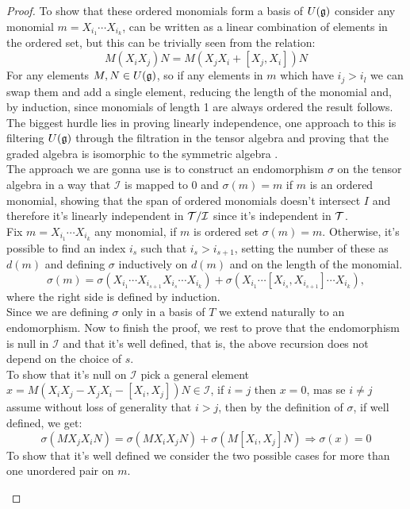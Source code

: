 \begin{proof}
	To show that these ordered monomials form a basis of $U(\mathfrak{g})$ consider any monomial
	$m=X_{i_1}\cdots X_{i_k}$, can be written as a linear combination of elements in the ordered set, but this can be trivially seen from the relation:
	$$ M(X_iX_j)N = M(X_jX_i+[X_j,X_i])N$$
	For any elements $M,N \in U(\mathfrak{g})$, so if any elements in $m$ which have $i_j>i_l$ we can swap them and add a single element, reducing the length of the monomial and, by induction, since monomials of length 1 are always ordered the result follows.\\
	The biggest hurdle lies in proving linearly independence, one approach to this is filtering $U(\mathfrak{g})$ through the filtration in the tensor algebra and proving that the graded algebra is isomorphic to the symmetric algebra \cite{humphreys1}.\\
	The approach we are gonna use is to construct an endomorphism $\sigma$ on the tensor algebra in a way that $\mathcal{I}$ is mapped to $0$ and $\sigma(m) = m$ if $m$ is an ordered monomial, showing that the span of ordered monomials doesn't intersect $I$ and therefore it's linearly independent in $\mathcal{T}/\mathcal{I}$ since it's independent in $\mathcal{T}$.\\
	Fix $m=X_{i_1}\cdots X_{i_k}$ any monomial, if $m$ is ordered set $\sigma(m)=m$. Otherwise, it's possible to find an index $i_s$ such that $i_s > i_{s+1}$, setting the number of these as $d(m)$ and defining $\sigma$ inductively on $d(m)$ and on the length of the monomial.
	$$ \sigma(m) = \sigma(X_{i_1}\cdots X_{i_{s+1}}X_{i_s}\cdots X_{i_k}) + \sigma(X_{i_1}\cdots [X_{i_s},X_{i_{s+1}}]\cdots X_{i_k}),$$	
	where the right side is defined by induction.\\
	Since we are defining $\sigma$ only in a basis of $T$ we  extend naturally to an endomorphism. Now to finish the proof, we rest to prove that the endomorphism is null in $\mathcal{I}$ and that it's well defined, that is, the above recursion does not depend on the choice of $s$.\\
	To show that it's null on $\mathcal{I}$ pick a general element $x = M(X_iX_j - X_jX_i - [X_i,X_j])N \in \mathcal{I}$, if $i=j$ then $x=0$, mas se $i\not=j$ assume without loss of generality that $i>j$, then by the definition of $\sigma$, if well defined, we get:
	$$\sigma(MX_jX_iN) = \sigma(MX_iX_jN) + \sigma(M[X_i,X_j]N) \Rightarrow \sigma(x)=0$$
	To show that it's well defined we consider the two possible cases for more than one unordered pair on $m$.
	\begin{enumerate}

\end{enumerate}
\end{proof}
